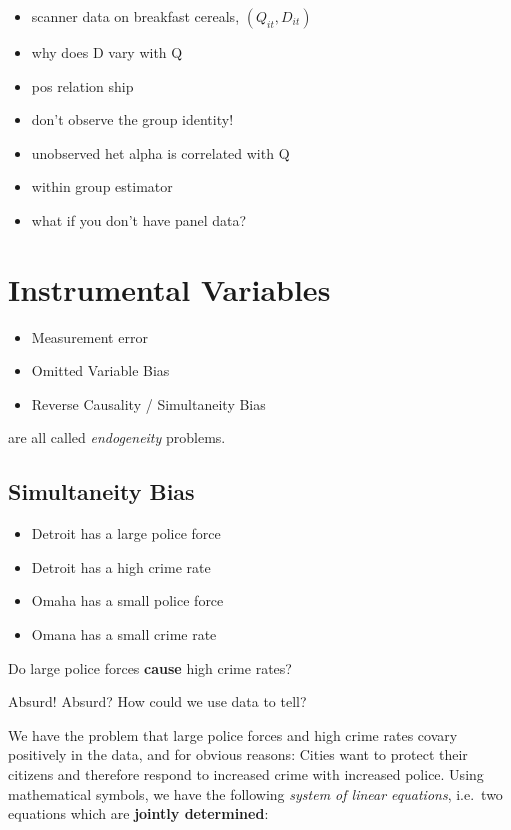 \documentclass[]{book}
\providecommand{\tightlist}{%
  \setlength{\itemsep}{0pt}\setlength{\parskip}{0pt}}
\theoremstyle{definition}
\theoremstyle{definition}
\theoremstyle{definition}
\theoremstyle{remark}
\begin{document}
\begin{itemize}
\tightlist
\item
  scanner data on breakfast cereals, \((Q_{it},D_{it})\)
\item
  why does D vary with Q
\item
  pos relation ship
\item
  don't observe the group identity!
\item
  unobserved het alpha is correlated with Q
\item
  within group estimator
\item
  what if you don't have panel data?
\end{itemize}

\chapter{Instrumental Variables}\label{IV}

\begin{itemize}
\tightlist
\item
  Measurement error
\item
  Omitted Variable Bias
\item
  Reverse Causality / Simultaneity Bias
\end{itemize}

are all called \emph{endogeneity} problems.

\section{Simultaneity Bias}\label{simultaneity-bias}

\begin{itemize}
\tightlist
\item
  Detroit has a large police force
\item
  Detroit has a high crime rate
\item
  Omaha has a small police force
\item
  Omana has a small crime rate
\end{itemize}

Do large police forces \textbf{cause} high crime rates?

Absurd! Absurd? How could we use data to tell?

We have the problem that large police forces and high crime rates covary
positively in the data, and for obvious reasons: Cities want to protect
their citizens and therefore respond to increased crime with increased
police. Using mathematical symbols, we have the following \emph{system
of linear equations}, i.e.~two equations which are \textbf{jointly
determined}:
\end{document}
